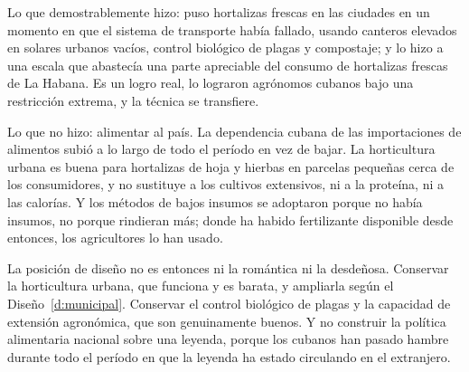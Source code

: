 Lo que demostrablemente hizo: puso hortalizas frescas en las ciudades en un momento en que el
sistema de transporte había fallado, usando canteros elevados en solares urbanos vacíos,
control biológico de plagas y compostaje; y lo hizo a una escala que abastecía una parte
apreciable del consumo de hortalizas frescas de La Habana. Es un logro real, lo lograron
agrónomos cubanos bajo una restricción extrema, y la técnica se transfiere.

Lo que no hizo: alimentar al país. La dependencia cubana de las importaciones de alimentos subió
a lo largo de todo el período en vez de bajar. La horticultura urbana es buena para hortalizas
de hoja y hierbas en parcelas pequeñas cerca de los consumidores, y no sustituye a los cultivos
extensivos, ni a la proteína, ni a las calorías. Y los métodos de bajos insumos se adoptaron
porque no había insumos, no porque rindieran más; donde ha habido fertilizante disponible
desde entonces, los agricultores lo han usado.

La posición de diseño no es entonces ni la romántica ni la desdeñosa. Conservar la horticultura
urbana, que funciona y es barata, y ampliarla según el Diseño~\ref{d:municipal}. Conservar el
control biológico de plagas y la capacidad de extensión agronómica, que son genuinamente
buenos. Y no construir la política alimentaria nacional sobre una leyenda, porque los cubanos
han pasado hambre durante todo el período en que la leyenda ha estado circulando en el
extranjero.
